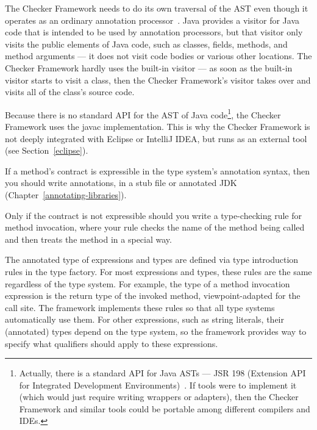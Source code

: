 The Checker Framework needs to do its own traversal of the AST even though
it operates as an ordinary annotation processor~\cite{JSR269}.  Java
provides a visitor for Java code that is intended to be used by annotation
processors, but that visitor only
visits the public elements of Java code, such as classes, fields, methods,
and method arguments --- it does not visit code bodies or various other
locations.  The Checker Framework hardly uses the built-in visitor --- as
soon as the built-in visitor starts to visit a class, then the Checker
Framework's visitor takes over and visits all of the class's source code.

Because there is no standard API for the AST of Java
code\footnote{Actually, there is a standard API for Java ASTs --- JSR 198
  (Extension API for Integrated Development Environments)~\cite{JSR198}.
  If tools were to implement it (which would just require writing wrappers
  or adapters), then the Checker Framework and similar tools could be
  portable among different compilers and IDEs.}, the Checker Framework uses
the javac implementation.  This is why the Checker Framework is not deeply
integrated with Eclipse or IntelliJ IDEA, but runs as an external tool (see
Section~\ref{eclipse}).



If a method's contract is expressible in the type system's annotation
syntax, then you should write annotations, in a stub file or annotated JDK
(Chapter~\ref{annotating-libraries}).

Only if the contract is not expressible should you write a type-checking
rule for method invocation, where your rule checks the name of the method
being called and then treats the method in a special way.



The annotated type of expressions and types are defined via type introduction rules in the
type factory.  For most expressions and types, these rules are the same regardless of the type system.
For example, the type of a method invocation expression is the return type of the invoked method,
viewpoint-adapted for the call site.  The framework implements these rules so that all type systems
automatically use them.  For other expressions, such as string literals, their (annotated) types depend
on the type system, so the framework provides way to specify what qualifiers should apply to these expressions.

